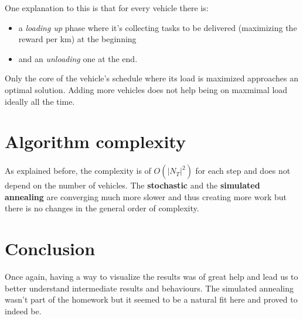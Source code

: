\documentclass[11pt,a4paper]{article}
\begin{document}
One explanation to this is that for every vehicle there is:
\begin{itemize}
    \item a \emph{loading up} phase where it's collecting tasks to be delivered
        (maximizing the reward per km) at the beginning

    \item and an \emph{unloading} one at the end.

\end{itemize}

Only the core of the vehicle's schedule where its load is maximized approaches
an optimal solution. Adding more vehicles does not help being on maxmimal load
ideally all the time.


\section*{Algorithm complexity}

As explained before, the complexity is of $O(|N_T|^2)$ for each step and does not
depend on the number of vehicles. The \textbf{stochastic} and the
\textbf{simulated annealing} are converging much more slower and thus creating
more work but there is no changes in the general order of complexity.


\section*{Conclusion}

Once again, having a way to visualize the results was of great help and lead us
to better understand intermediate results and behaviours. The simulated
annealing wasn't part of the homework but it seemed to be a natural fit here
and proved to indeed be.
\end{document}
